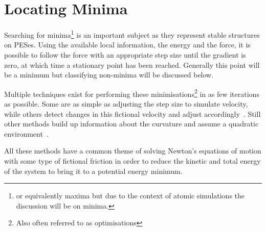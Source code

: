 \section{Locating Minima}
\label{sec:minima}
Searching for minima\footnote{or equivalently maxima but due to the context of atomic simulations the discussion will be on minima.} is an important subject as they represent stable structures on PESes.
Using the available local information, the energy and the force, it is possible to follow the force with an appropriate step size until the gradient is zero, at which time a stationary point has been reached.
Generally this point will be a minimum but classifying non-minima will be discussed below.

Multiple techniques exist for performing these minimisations\footnote{Also often referred to as optimisations} in as few iterations as possible.
Some are as simple as adjusting the step size to simulate velocity, while others detect changes in this fictional velocity and adjust accordingly~\cite{cg-original-1952, fire}.
Still other methods build up information about the curvature and assume a quadratic environment~\cite{lbfgs}.

All these methods have a common theme of solving Newton's equations of motion with some type of fictional friction in order to reduce the kinetic and total energy of the system to bring it to a potential energy minimum.
